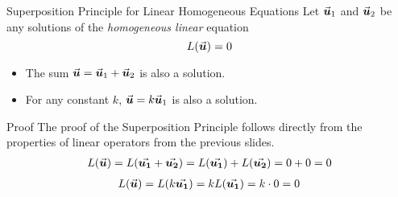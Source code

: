\documentclass{beamer}
\begin{document}
\begin{frame}
\begin{block}{Superposition Principle for Linear Homogeneous Equations}
Let ${\vec{\boldsymbol{u}}}_1$ and ${\vec{\boldsymbol{u}}}_2$ be any solutions of the \emph{homogeneous linear} equation
\begin{equation*}
L({\vec{\boldsymbol{u}}})=0
\end{equation*}

\vspace{-3mm}
\begin{itemize}
\item The sum ${\vec{\boldsymbol{u}}}={\vec{\boldsymbol{u}}}_1+{\vec{\boldsymbol{u}}}_2$ is also a solution.
\item For any constant $k$, ${\vec{\boldsymbol{u}}}=k{\vec{\boldsymbol{u}}}_1$ is also a solution.
\end{itemize}
\end{block}\pause

\begin{block}{Proof}
The proof of the Superposition Principle follows directly from the properties of linear operators from the previous slides.
\begin{equation*}
\begin{aligned}
L({\vec{\boldsymbol{u}}}) = L({\vec{\boldsymbol{u_1}}}+{\vec{\boldsymbol{u_2}}})
= L({\vec{\boldsymbol{u_1}}}) + L({\vec{\boldsymbol{u_2}}})
= 0 + 0 = 0
\end{aligned}
\end{equation*}
\begin{equation*}
\begin{aligned}
L({\vec{\boldsymbol{u}}}) = L(k {\vec{\boldsymbol{u_1}}})
= k L({\vec{\boldsymbol{u_1}}})
= k\cdot 0 = 0
\end{aligned}
\end{equation*}
\end{block}
\end{frame}
\end{document}
